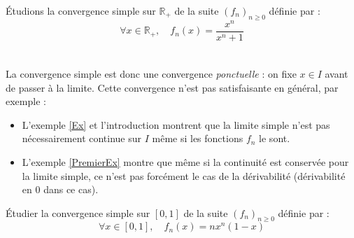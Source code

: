 \documentclass[a4paper,10pt]{report}
\begin{document}
\begin{Exemple}\label{Ex} Étudions la convergence simple  sur $\mathbb{R}_+$ de la suite $(f_n)_{n \geq 0}$ définie par :
$$ \forall x \in \mathbb{R}_+, \quad f_n(x) = \frac{x^n}{x^n+1}$$


\newpage
$\phantom{test}$
%
%
%
%

\vspace{8cm}

\end{Exemple}

\begin{Remarque}{} La convergence simple est donc une convergence \emph{ponctuelle} : on fixe $x \in I$ avant de passer à la limite. Cette convergence n'est pas satisfaisante en général, par exemple :

\begin{itemize}
\item L'exemple \ref{Ex} et l'introduction montrent que la limite simple n'est pas nécessairement continue sur $I$ même si les fonctions $f_n$ le sont.
\item L'exemple \ref{PremierEx} montre que même si la continuité est conservée pour la limite simple, ce n'est pas forcément le cas de la dérivabilité (dérivabilité en $0$ dans ce cas).
\end{itemize}
\end{Remarque}

\begin{ApplicationDirecte} Étudier la convergence simple sur $[0,1]$ de la suite $(f_n)_{n \geq 0}$ définie par :
$$ \forall x \in [0,1], \quad f_n(x) = n x^n(1-x)$$
\end{ApplicationDirecte}
\end{document}
